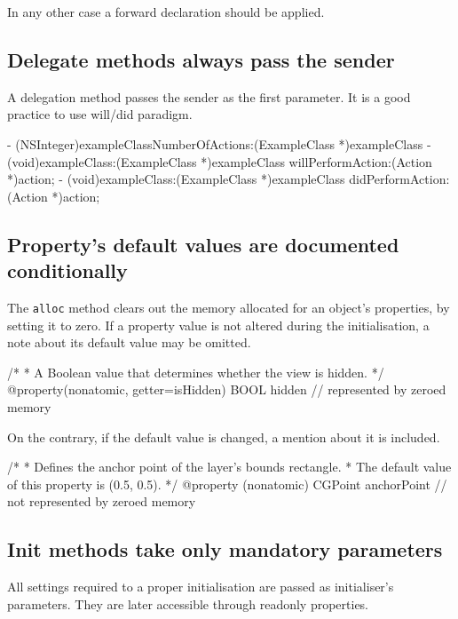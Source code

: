 \documentclass[10pt]{extarticle}
\newenvironment{codelisting}
{\footnotesize\mdframed[middlelinewidth=0.5pt, middlelinecolor=BaliHaiColor, skipabove=15pt]\verbatim}
{\endverbatim\endmdframed\vspace{12pt}\normalsize}
\newcommand{\inlinecode}[1]{{\textcolor{TundoraColor}{\texttt{#1}}}}
\begin{document}
In any other case a forward declaration should be applied.


\subsection{Delegate methods always pass the sender}

A delegation method passes the sender as the first parameter. It is a good practice to use will/did paradigm.

\begin{codelisting}
- (NSInteger)exampleClassNumberOfActions:(ExampleClass *)exampleClass
- (void)exampleClass:(ExampleClass *)exampleClass willPerformAction:(Action *)action;
- (void)exampleClass:(ExampleClass *)exampleClass didPerformAction:(Action *)action;
\end{codelisting}


\subsection{Property's default values are documented conditionally}

The \inlinecode{alloc} method clears out the memory allocated for an object’s properties, by setting it to zero. If a property value is not altered during the initialisation, a note about its default value may be omitted.

\begin{codelisting}
/*
 * A Boolean value that determines whether the view is hidden.
 */
@property(nonatomic, getter=isHidden) BOOL hidden                // represented by zeroed memory
\end{codelisting}

On the contrary, if the default value is changed, a mention about it is included.

\begin{codelisting}
/*
 * Defines the anchor point of the layer's bounds rectangle.
 * The default value of this property is (0.5, 0.5).
 */
@property (nonatomic) CGPoint anchorPoint                       // not represented by zeroed memory
\end{codelisting}

\subsection{Init methods take only mandatory parameters}

All settings required to a proper initialisation are passed as initialiser's parameters. They are later accessible through readonly properties.
\end{document}
